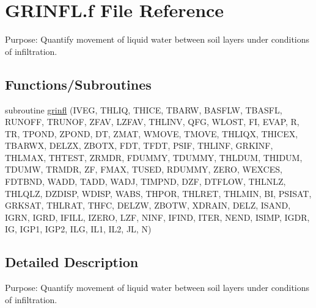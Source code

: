 \hypertarget{GRINFL_8f}{}\section{G\+R\+I\+N\+F\+L.\+f File Reference}
\label{GRINFL_8f}


Purpose\+: Quantify movement of liquid water between soil layers under conditions of infiltration.  


\subsection*{Functions/\+Subroutines}
\begin{DoxyCompactItemize}
\item 
subroutine \hyperlink{GRINFL_8f_aac6f2d3fad2a7b2c287fb2b821ba61f4}{grinfl} (I\+V\+E\+G, T\+H\+L\+I\+Q, T\+H\+I\+C\+E, T\+B\+A\+R\+W, B\+A\+S\+F\+L\+W, T\+B\+A\+S\+F\+L, R\+U\+N\+O\+F\+F, T\+R\+U\+N\+O\+F, Z\+F\+A\+V, L\+Z\+F\+A\+V, T\+H\+L\+I\+N\+V, Q\+F\+G, W\+L\+O\+S\+T, F\+I, E\+V\+A\+P, R, T\+R, T\+P\+O\+N\+D, Z\+P\+O\+N\+D, D\+T, Z\+M\+A\+T, W\+M\+O\+V\+E, T\+M\+O\+V\+E, T\+H\+L\+I\+Q\+X, T\+H\+I\+C\+E\+X, T\+B\+A\+R\+W\+X, D\+E\+L\+Z\+X, Z\+B\+O\+T\+X, F\+D\+T, T\+F\+D\+T, P\+S\+I\+F, T\+H\+L\+I\+N\+F, G\+R\+K\+I\+N\+F, T\+H\+L\+M\+A\+X, T\+H\+T\+E\+S\+T, Z\+R\+M\+D\+R, F\+D\+U\+M\+M\+Y, T\+D\+U\+M\+M\+Y, T\+H\+L\+D\+U\+M, T\+H\+I\+D\+U\+M, T\+D\+U\+M\+W, T\+R\+M\+D\+R, Z\+F, F\+M\+A\+X, T\+U\+S\+E\+D, R\+D\+U\+M\+M\+Y, Z\+E\+R\+O, W\+E\+X\+C\+E\+S, F\+D\+T\+B\+N\+D, W\+A\+D\+D, T\+A\+D\+D, W\+A\+D\+J, T\+I\+M\+P\+N\+D, D\+Z\+F, D\+T\+F\+L\+O\+W, T\+H\+L\+N\+L\+Z, T\+H\+L\+Q\+L\+Z, D\+Z\+D\+I\+S\+P, W\+D\+I\+S\+P, W\+A\+B\+S, T\+H\+P\+O\+R, T\+H\+L\+R\+E\+T, T\+H\+L\+M\+I\+N, B\+I, P\+S\+I\+S\+A\+T, G\+R\+K\+S\+A\+T, T\+H\+L\+R\+A\+T, T\+H\+F\+C, D\+E\+L\+Z\+W, Z\+B\+O\+T\+W, X\+D\+R\+A\+I\+N, D\+E\+L\+Z, I\+S\+A\+N\+D, I\+G\+R\+N, I\+G\+R\+D, I\+F\+I\+L\+L, I\+Z\+E\+R\+O, L\+Z\+F, N\+I\+N\+F, I\+F\+I\+N\+D, I\+T\+E\+R, N\+E\+N\+D, I\+S\+I\+M\+P, I\+G\+D\+R, I\+G, I\+G\+P1, I\+G\+P2, I\+L\+G, I\+L1, I\+L2, J\+L, N)
\end{DoxyCompactItemize}


\subsection{Detailed Description}
Purpose\+: Quantify movement of liquid water between soil layers under conditions of infiltration. 



